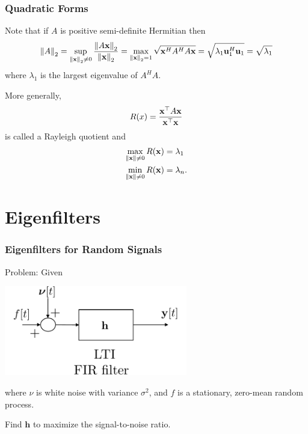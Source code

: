 \documentclass{beamer}
\begin{document}
\begin{frame}\frametitle{Quadratic Forms}
	Note that if $A$ is positive semi-definite Hermitian then
	\begin{align*}
		\left\|A\right\|_2 
			= \sup_{\left\|\mathbf{x}\right\|_2\neq 0}\frac{\left\|A\mathbf{x}\right\|_2}{\left\|\mathbf{x}\right\|_2} 
			= \max_{\left\|\mathbf{x}\right\|_2 = 1} \sqrt{\mathbf{x}^H A^H A\mathbf{x}} 
			= \sqrt{\lambda_1 \mathbf{u}_1^H \mathbf{u}_1} 
			= \sqrt{\lambda_1} 
	\end{align*}
	where $\lambda_1$ is the largest eigenvalue of $A^H A$.
	
	\vfill
	
	More generally,
	\[ 
		R(x) = \frac{\mathbf{x}^\top A\mathbf{x}}{\mathbf{x}^\top \mathbf{x}} 
	\] 
	is called a Rayleigh quotient and
	\begin{align*}
		\max_{\left\|\mathbf{x}\right\|\neq 0} R(\mathbf{x}) &= \lambda_1 \\
		\min_{\left\|\mathbf{x}\right\|\neq 0} R(\mathbf{x}) &= \lambda_n.
	\end{align*}
\end{frame}



\section{Eigenfilters}
\frame{\sectionpage}

\begin{frame}\frametitle{Eigenfilters for Random Signals}
	{\color{blue}Problem:}
	Given
	\begin{center}
		\includegraphics[width=0.6\textwidth]{figures/chap6_eigenfilter}
	\end{center}
	where $\nu$ is white noise with variance $\sigma^2$, and $f$ is a stationary, zero-mean random process.
	
	\vfill
	
	Find $\mathbf{h}$ to maximize the signal-to-noise ratio.
\end{frame}
\end{document}

